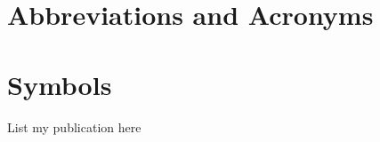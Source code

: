 \documentclass[phd, print]{nuthesis}
\begin{document}
\chapter{Abbreviations and Acronyms}
\chapter{Symbols}

\begin{onehalfspacing}


\end{onehalfspacing}

\newpage
\begin{listofpub}
  List my publication here
\end{listofpub}

\end{document}
